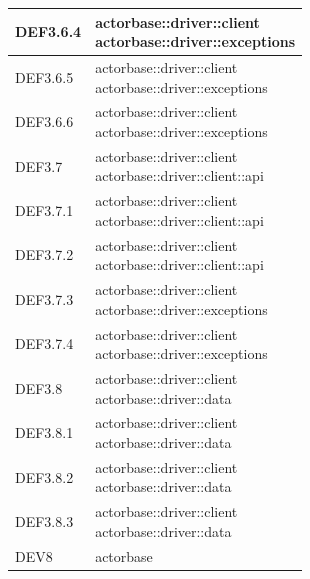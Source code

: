 \documentclass{scalatekids-article}
\begin{document}
\begin{longtable}[H]{|p{6cm}|p{11cm}|}
DEF3.6.4 & \multiLineCell[t]{actorbase::driver::client\\actorbase::driver::exceptions\\}\\
\hline
DEF3.6.5 & \multiLineCell[t]{actorbase::driver::client\\actorbase::driver::exceptions\\}\\
\hline
DEF3.6.6 & \multiLineCell[t]{actorbase::driver::client\\actorbase::driver::exceptions\\}\\
\hline
DEF3.7 & \multiLineCell[t]{actorbase::driver::client\\actorbase::driver::client::api\\}\\
\hline
DEF3.7.1 & \multiLineCell[t]{actorbase::driver::client\\actorbase::driver::client::api\\}\\
\hline
DEF3.7.2 & \multiLineCell[t]{actorbase::driver::client\\actorbase::driver::client::api\\}\\
\hline
DEF3.7.3 & \multiLineCell[t]{actorbase::driver::client\\actorbase::driver::exceptions\\}\\
\hline
DEF3.7.4 & \multiLineCell[t]{actorbase::driver::client\\actorbase::driver::exceptions\\}\\
\hline
DEF3.8 & \multiLineCell[t]{actorbase::driver::client\\actorbase::driver::data\\}\\
\hline
DEF3.8.1 & \multiLineCell[t]{actorbase::driver::client\\actorbase::driver::data\\}\\
\hline
DEF3.8.2 & \multiLineCell[t]{actorbase::driver::client\\actorbase::driver::data\\}\\
\hline
DEF3.8.3 & \multiLineCell[t]{actorbase::driver::client\\actorbase::driver::data\\}\\
\hline
DEV8 & \multiLineCell[t]{actorbase\\}\\

\end{longtable}
\end{document}
